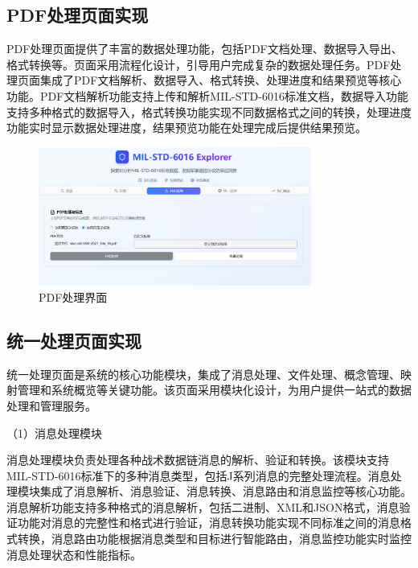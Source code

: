 \subsection{PDF处理页面实现}

PDF处理页面提供了丰富的数据处理功能，包括PDF文档处理、数据导入导出、格式转换等。页面采用流程化设计，引导用户完成复杂的数据处理任务。PDF处理页面集成了PDF文档解析、数据导入、格式转换、处理进度和结果预览等核心功能。PDF文档解析功能支持上传和解析MIL-STD-6016标准文档，数据导入功能支持多种格式的数据导入，格式转换功能实现不同数据格式之间的转换，处理进度功能实时显示数据处理进度，结果预览功能在处理完成后提供结果预览。

\begin{figure}[H]
\centering
\includegraphics[width=0.8\textwidth]{chapters/fig-0/front_pdfprocess.png}
\caption{PDF处理界面}
\label{fig:frontend-pdfprocess}
\end{figure}

\subsection{统一处理页面实现}

统一处理页面是系统的核心功能模块，集成了消息处理、文件处理、概念管理、映射管理和系统概览等关键功能。该页面采用模块化设计，为用户提供一站式的数据处理和管理服务。

（1）消息处理模块

消息处理模块负责处理各种战术数据链消息的解析、验证和转换。该模块支持MIL-STD-6016标准下的多种消息类型，包括J系列消息的完整处理流程。消息处理模块集成了消息解析、消息验证、消息转换、消息路由和消息监控等核心功能。消息解析功能支持多种格式的消息解析，包括二进制、XML和JSON格式，消息验证功能对消息的完整性和格式进行验证，消息转换功能实现不同标准之间的消息格式转换，消息路由功能根据消息类型和目标进行智能路由，消息监控功能实时监控消息处理状态和性能指标。

